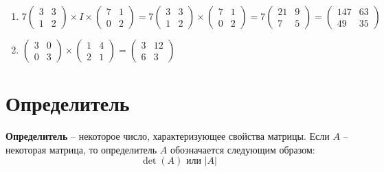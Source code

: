 \documentclass[11pt, a4paper]{extarticle}
\begin{document}
\begin{enumerate}[label=\alph*)]
		\item $7\begin{pmatrix}
		3 & 3 \\
		1 & 2
		\end{pmatrix}\times I \times \begin{pmatrix}
		7 & 1 \\
		0 & 2
		\end{pmatrix} = 7\begin{pmatrix}
		3 & 3 \\
		1 & 2
		\end{pmatrix} \times \begin{pmatrix}
		7 & 1 \\
		0 & 2
		\end{pmatrix} = 7 \begin{pmatrix}
		21 & 9 \\
		7 & 5
		\end{pmatrix} = \begin{pmatrix}
		147 & 63 \\
		49 & 35
		\end{pmatrix}$
		
		\item $\begin{pmatrix}
		3 & 0 \\
		0 & 3
		\end{pmatrix}\times \begin{pmatrix}
		1 & 4 \\
		2 & 1
		\end{pmatrix} =\begin{pmatrix}
		3 & 12 \\
		6 & 3
		\end{pmatrix} $
	\end{enumerate}


\section{Определитель}

\textbf{Определитель} – некоторое число, характеризующее свойства матрицы. Если $A$ – некоторая матрица, то определитель $A$ обозначается следующим образом:
\[
\det(A) \text{ или } |A|
\]
\end{document}
